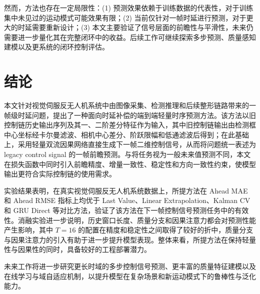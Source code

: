 \documentclass[journal]{IEEEtran}
\begin{document}
然而，方法也存在一定局限性：(1) 预测效果依赖于训练数据的代表性，对于训练集中未见过的运动模式可能效果有限；(2) 当前仅针对一帧时延进行预测，对于更大的时延需要重新设计；(3) 本文主要验证了信号层面的前瞻性与平滑性，未来仍需要进一步量化其在完整闭环中的收益。后续工作可继续探索多步预测、质量感知建模以及更系统的闭环控制评估。

\section{结论}
本文针对视觉伺服反无人机系统中由图像采集、检测推理和后续整形链路带来的一帧级时延问题，提出了一种面向时延补偿的端到端轻量时序预测方法。该方法以旧控制链历史输出序列及其一、二阶差分特征作为输入，其中旧控制链输出由检测框中心坐标经卡尔曼滤波、相机中心差分、阶跃限幅和低通滤波后得到；在此基础上，采用轻量双流因果网络直接生成下一帧二维控制信号，从而将问题统一表述为 legacy control signal 的一帧前瞻预测。与将任务视为一般未来值预测不同，本文在损失函数中同时引入前瞻精度、增量一致性、稳定性和方向一致性约束，使模型输出更符合实际控制链的使用需求。

实验结果表明，在真实视觉伺服反无人机系统数据上，所提方法在 Ahead MAE 和 Ahead RMSE 指标上均优于 Last Value、Linear Extrapolation、Kalman CV 和 GRU Direct 等对比方法，验证了该方法在下一帧控制信号预测任务中的有效性。消融实验进一步说明，历史窗口长度、质量分支和因果注意力都会对预测性能产生影响，其中 $T=16$ 的配置在精度和稳定性之间取得了较好的折中，质量分支与因果注意力的引入有助于进一步提升模型表现。整体来看，所提方法在保持轻量性与因果性的同时，具备较好的工程部署潜力。

未来工作将进一步研究更长时域的多步控制信号预测、更丰富的质量特征建模以及在线学习与域自适应机制，以提升模型在复杂场景和新运动模式下的鲁棒性与泛化能力。



\end{document}
